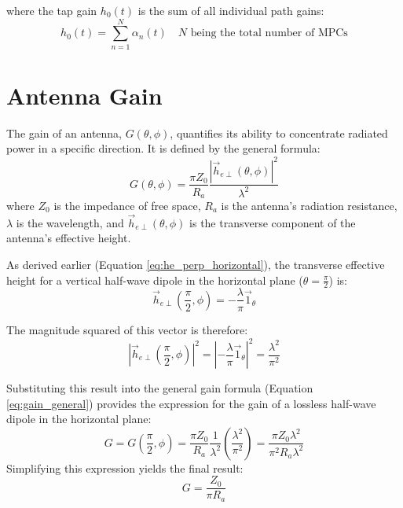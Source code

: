 where the tap gain $h_0(t)$ is the sum of all individual path gains:
\begin{equation}
	\label{eq:narrow}
	\boxed{h_0(t) = \sum_{n=1}^{N} \alpha_n(t)} \quad N \text{ being the total number of MPCs}
\end{equation}

\section{Antenna Gain}
The gain of an antenna, $G(\theta, \phi)$, quantifies its ability to concentrate radiated power in a specific direction. It is defined by the general formula:
\begin{equation}
	G(\theta,\phi) = \frac{\pi Z_0}{R_a} \frac{|\vec{h}_{e\perp}(\theta,\phi)|^2}{\lambda^2}
	\label{eq:gain_general}
\end{equation}
where $Z_0$ is the impedance of free space, $R_a$ is the antenna's radiation resistance, $\lambda$ is the wavelength, and $\vec{h}_{e\perp}(\theta,\phi)$ is the transverse component of the antenna's effective height.

As derived earlier (Equation \ref{eq:he_perp_horizontal}), the transverse effective height for a vertical half-wave dipole in the horizontal plane ($\theta = \frac{\pi}{2}$) is:
\begin{equation}
	\vec{h}_{e\perp}\left(\frac{\pi}{2},\phi\right) = -\frac{\lambda}{\pi}\vec{1}_{\theta}
\end{equation}

The magnitude squared of this vector is therefore:
\begin{equation}
	\left|\vec{h}_{e\perp}\left(\frac{\pi}{2},\phi\right)\right|^2 = \left|-\frac{\lambda}{\pi}\vec{1}_{\theta}\right|^2 = \frac{\lambda^2}{\pi^2}
\end{equation}

Substituting this result into the general gain formula (Equation \ref{eq:gain_general}) provides the expression for the gain of a lossless half-wave dipole in the horizontal plane:
\begin{equation}
	G = G\left(\frac{\pi}{2}, \phi\right) = \frac{\pi Z_0}{R_a} \frac{1}{\lambda^2} \left(\frac{\lambda^2}{\pi^2}\right) = \frac{\pi Z_0 \lambda^2}{\pi^2 R_a \lambda^2}
\end{equation}
Simplifying this expression yields the final result:
\begin{equation}
	G = \frac{Z_0}{\pi R_a}
	\label{eq:gain_derived}
\end{equation}

